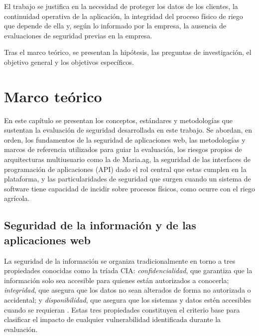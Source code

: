 \documentclass[12pt,letterpaper]{report}
\begin{document}
El trabajo se justifica en la necesidad de proteger los datos de los clientes,
la continuidad operativa de la aplicación, la integridad del proceso físico
de riego que depende de ella y, según lo informado por la empresa, la
ausencia de evaluaciones de seguridad previas en la empresa.

Tras el marco teórico, se presentan la hipótesis, las preguntas de investigación,
el objetivo general y los objetivos específicos.

\newpage

\chapter*{Marco teórico}

En este capítulo se presentan los conceptos, estándares y metodologías que
sustentan la evaluación de seguridad desarrollada en este trabajo. Se abordan,
en orden, los fundamentos de la seguridad de aplicaciones web, las
metodologías y marcos de referencia utilizados para guiar la evaluación, los
riesgos propios de arquitecturas multiusuario como la de Maria.ag, la
seguridad de las interfaces de programación de aplicaciones (API) dado el rol
central que estas cumplen en la plataforma, y las particularidades de
seguridad que surgen cuando un sistema de software tiene capacidad de incidir
sobre procesos físicos, como ocurre con el riego agrícola.

\section*{Seguridad de la información y de las aplicaciones web}

La seguridad de la información se organiza tradicionalmente en torno a tres
propiedades conocidas como la tríada CIA: \textit{confidencialidad}, que
garantiza que la información solo sea accesible para quienes están
autorizados a conocerla; \textit{integridad}, que asegura que los datos no
sean alterados de forma no autorizada o accidental; y \textit{disponibilidad},
que asegura que los sistemas y datos estén accesibles cuando se requieran
\autocite{stallings2018}. Estas tres propiedades constituyen el criterio base
para clasificar el impacto de cualquier vulnerabilidad identificada durante la
evaluación.
\end{document}
